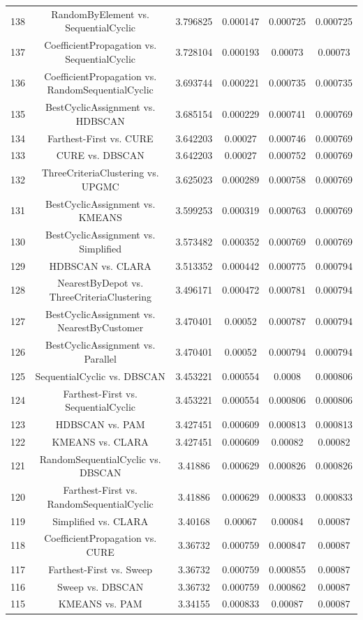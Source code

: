 \documentclass[a4paper,10pt]{article}
\begin{document}
\begin{landscape}
\begin{table}[!htp]
\begin{tabular}{cccccc}
138&RandomByElement vs. SequentialCyclic&3.796825&0.000147&0.000725&0.000725\\
137&CoefficientPropagation vs. SequentialCyclic&3.728104&0.000193&0.00073&0.00073\\
136&CoefficientPropagation vs. RandomSequentialCyclic&3.693744&0.000221&0.000735&0.000735\\
135&BestCyclicAssignment vs. HDBSCAN&3.685154&0.000229&0.000741&0.000769\\
134&Farthest-First vs. CURE&3.642203&0.00027&0.000746&0.000769\\
133&CURE vs. DBSCAN&3.642203&0.00027&0.000752&0.000769\\
132&ThreeCriteriaClustering vs. UPGMC&3.625023&0.000289&0.000758&0.000769\\
131&BestCyclicAssignment vs. KMEANS&3.599253&0.000319&0.000763&0.000769\\
130&BestCyclicAssignment vs. Simplified&3.573482&0.000352&0.000769&0.000769\\
129&HDBSCAN vs. CLARA&3.513352&0.000442&0.000775&0.000794\\
128&NearestByDepot vs. ThreeCriteriaClustering&3.496171&0.000472&0.000781&0.000794\\
127&BestCyclicAssignment vs. NearestByCustomer&3.470401&0.00052&0.000787&0.000794\\
126&BestCyclicAssignment vs. Parallel&3.470401&0.00052&0.000794&0.000794\\
125&SequentialCyclic vs. DBSCAN&3.453221&0.000554&0.0008&0.000806\\
124&Farthest-First vs. SequentialCyclic&3.453221&0.000554&0.000806&0.000806\\
123&HDBSCAN vs. PAM&3.427451&0.000609&0.000813&0.000813\\
122&KMEANS vs. CLARA&3.427451&0.000609&0.00082&0.00082\\
121&RandomSequentialCyclic vs. DBSCAN&3.41886&0.000629&0.000826&0.000826\\
120&Farthest-First vs. RandomSequentialCyclic&3.41886&0.000629&0.000833&0.000833\\
119&Simplified vs. CLARA&3.40168&0.00067&0.00084&0.00087\\
118&CoefficientPropagation vs. CURE&3.36732&0.000759&0.000847&0.00087\\
117&Farthest-First vs. Sweep&3.36732&0.000759&0.000855&0.00087\\
116&Sweep vs. DBSCAN&3.36732&0.000759&0.000862&0.00087\\
115&KMEANS vs. PAM&3.34155&0.000833&0.00087&0.00087\\

\end{tabular}
\end{table}
\end{landscape}
\end{document}

